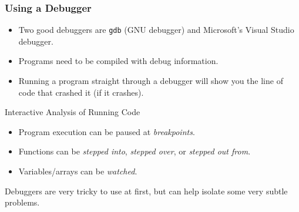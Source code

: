 \documentclass[table]{beamer}
\begin{document}
\begin{frame}
\frametitle{Using a Debugger}
\begin{itemize}
\item Two good debuggers are {\tt gdb} (GNU debugger) and Microsoft's Visual Studio debugger.
\item Programs need to be compiled with debug information.
\item Running a program straight through a debugger will show you the line of code that crashed it (if it crashes).
\end{itemize}

\begin{exampleblock}{Interactive Analysis of Running Code}
\begin{itemize}
\item Program execution can be paused at \emph{breakpoints}.
\item Functions can be \emph{stepped into}, \emph{stepped over}, or
\emph{stepped out from}.
\item Variables/arrays can be \emph{watched}.
\end{itemize}
\end{exampleblock}

\begin{alertblock}{}
Debuggers are very tricky to use at first, but can help isolate some very subtle problems.
\end{alertblock}
\end{frame}
\end{document}
